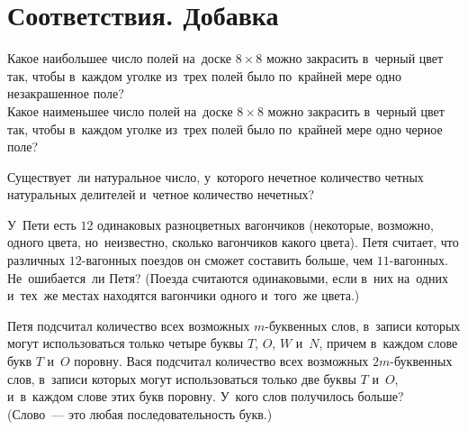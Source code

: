 
\section*{Соответствия. Добавка}


\begin{problems}

\item
\subproblem
Какое наибольшее число полей на~доске $8 \times 8$ можно закрасить в~черный
цвет так, чтобы в~каждом уголке из~трех полей было по~крайней мере одно
незакрашенное поле?
\\
\subproblem
Какое наименьшее число полей на~доске $8 \times 8$ можно закрасить в~черный
цвет так, чтобы в~каждом уголке из~трех полей было по~крайней мере одно черное
поле?

\item
Существует~ли натуральное число, у~которого нечетное количество четных
натуральных делителей и~четное количество нечетных?

\item
У~Пети есть $12$ одинаковых разноцветных вагончиков (некоторые, возможно,
одного цвета, но~неизвестно, сколько вагончиков какого цвета).
Петя считает, что различных $12$-вагонных поездов он сможет составить больше,
чем $11$-вагонных.
Не~ошибается~ли Петя?
(Поезда считаются одинаковыми, если в~них на~одних и~тех~же местах находятся
вагончики одного и~того~же цвета.)

\item
Петя подсчитал количество всех возможных $m$-буквенных слов, в~записи которых
могут использоваться только четыре буквы $T$, $O$, $W$ и~$N$, причем в~каждом
слове букв $T$ и~$O$ поровну.
Вася подсчитал количество всех возможных $2m$-буквенных слов, в~записи которых
могут использоваться только две буквы $T$ и~$O$, и~в~каждом слове этих букв
поровну.
У~кого слов получилось больше?
(Слово~--- это любая последовательность букв.)

\end{problems}

